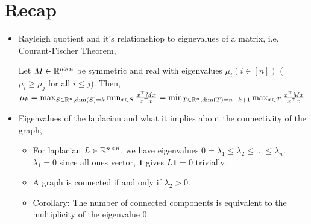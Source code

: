 \documentclass[11pt,letterpaper]{article}
\newcommand{\vOne}{\mathbf{1}}
\begin{document}
\section{Recap}
\begin{itemize}
\item Rayleigh quotient and it's relationshiop to eignevalues of a matrix, i.e. Courant-Fischer Theorem,
\begin{theorem}
Let $M \in \mathbb{R}^{n \times n}$ be symmetric and real with eigenvalues $\mu_i (i \in [n])$ ($\mu_i \ge \mu_j$ for all $i \le j$). Then, 
$\mu_k = \max_{S \in \mathbb{R}^n, \text{dim}(S)=k} \min_{x\in S} \frac{x^\top M x}{x^\top x} = \min_{T \in \mathbb{R}^n, \text{dim}(T)=n-k+1} \max_{x\in T} \frac{x^\top M x}{x^\top x}$
\end{theorem}
\item Eigenvalues of the laplacian and what it implies about the connectivity of the graph,
\begin{itemize}
\item For laplacian $L \in \mathbb{R}^{n \times n}$, we have eigenvalues $0=\lambda_1 \le \lambda_2 \le \dots \le \lambda_n$. $\lambda_1 = 0$ since all ones vector, $\vOne$ gives $L\vOne = 0$ trivially.
\item A graph is connected if and only if $\lambda_2 > 0$.
\item Corollary: The number of connected components is equivalent to the multiplicity of the eigenvalue $0$.
\end{itemize}
\end{itemize}
\end{document}
